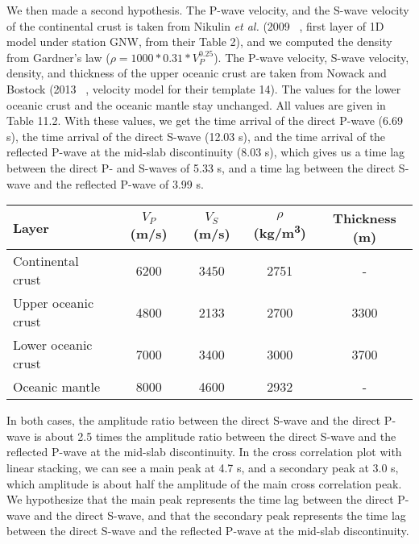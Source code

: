 \documentclass[main.tex]{subfiles}
\begin{document}
We then made a second hypothesis. The P-wave velocity, and the S-wave velocity of the continental crust is taken from Nikulin \textit{et al.} (2009 ~\cite{NIK_2009}, first layer of 1D model under station GNW, from their Table 2), and we computed the density from Gardner's law ($\rho = 1000 * 0.31 * V_P^{0.25}$). The P-wave velocity, S-wave velocity, density, and thickness of the upper oceanic crust are taken from Nowack and Bostock (2013 ~\cite{NOW_2013}, velocity model for their template 14). The values for the lower oceanic crust and the oceanic mantle stay unchanged. All values are given in Table 11.2. With these values, we get the time arrival of the direct P-wave (6.69 s), the time arrival of the direct S-wave (12.03 s), and the time arrival of the reflected P-wave at the mid-slab discontinuity (8.03 s), which gives us a time lag between the direct P- and S-waves of 5.33 s, and a time lag between the direct S-wave and the reflected P-wave of 3.99 s. \\

\begin{center}
\begin{tabular}{| l | c | c | c | c |}
  \hline
  Layer & $V_P$ (m/s) & $V_S$ (m/s) & $\rho$ (kg/m\textsuperscript{3}) & Thickness (m) \\
  \hline
  Continental crust & 6200 & 3450 & 2751 & - \\
  Upper oceanic crust & 4800 & 2133 & 2700 & 3300 \\
  Lower oceanic crust & 7000 & 3400 & 3000 & 3700 \\
  Oceanic mantle & 8000 & 4600 & 2932 & - \\
  \hline
\end{tabular}
\captionsetup{type=table}
\end{center}

In both cases, the amplitude ratio between the direct S-wave and the direct P-wave is about 2.5 times the amplitude ratio between the direct S-wave and the reflected P-wave at the mid-slab discontinuity. In the cross correlation plot with linear stacking, we can see a main peak at 4.7 s, and a secondary peak at 3.0 s, which amplitude is about half the amplitude of the main cross correlation peak. We hypothesize that the main peak represents the time lag between the direct P-wave and the direct S-wave, and that the secondary peak represents the time lag between the direct S-wave and the reflected P-wave at the mid-slab discontinuity. \\
\end{document}
